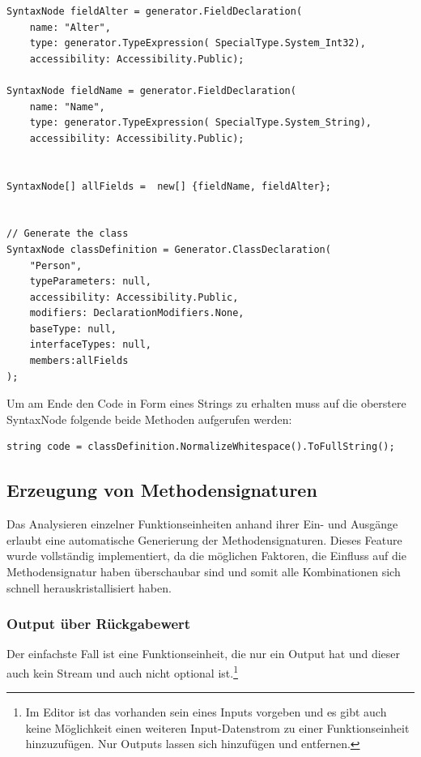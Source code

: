 	
	\begin{lstlisting}[caption=Erzeugung einer Person-Klasse mit Roslyn]
SyntaxNode fieldAlter = generator.FieldDeclaration(
	name: "Alter",
	type: generator.TypeExpression( SpecialType.System_Int32),
	accessibility: Accessibility.Public);

SyntaxNode fieldName = generator.FieldDeclaration(
	name: "Name",
	type: generator.TypeExpression( SpecialType.System_String),
	accessibility: Accessibility.Public);


SyntaxNode[] allFields =  new[] {fieldName, fieldAlter};


// Generate the class
SyntaxNode classDefinition = Generator.ClassDeclaration(
	"Person", 
	typeParameters: null,
	accessibility: Accessibility.Public,
	modifiers: DeclarationModifiers.None,
	baseType: null,
	interfaceTypes: null,
	members:allFields
);
	\end{lstlisting}
	
	Um am Ende den Code in Form eines Strings zu erhalten muss auf die oberstere
	SyntaxNode folgende beide Methoden aufgerufen werden:
	
	\begin{lstlisting}[caption=Erhalten des Codes als string]
	string code = classDefinition.NormalizeWhitespace().ToFullString();
	\end{lstlisting}


\subsection{Erzeugung von Methodensignaturen}

Das Analysieren einzelner Funktionseinheiten anhand ihrer Ein- und Ausgänge erlaubt eine automatische Generierung der Methodensignaturen.
Dieses Feature wurde vollständig implementiert, da die möglichen Faktoren, die Einfluss auf die Methodensignatur haben überschaubar sind und somit alle Kombinationen sich schnell herauskristallisiert haben.

\subsubsection{Output über Rückgabewert}

	Der einfachste Fall ist eine Funktionseinheit, die nur ein Output hat und
	dieser auch kein Stream und auch nicht optional ist.\footnote{Im Editor ist das vorhanden sein eines Inputs vorgeben und es gibt auch keine Möglichkeit einen weiteren Input-Datenstrom zu einer Funktionseinheit hinzuzufügen. Nur Outputs lassen sich hinzufügen und entfernen.}
	
